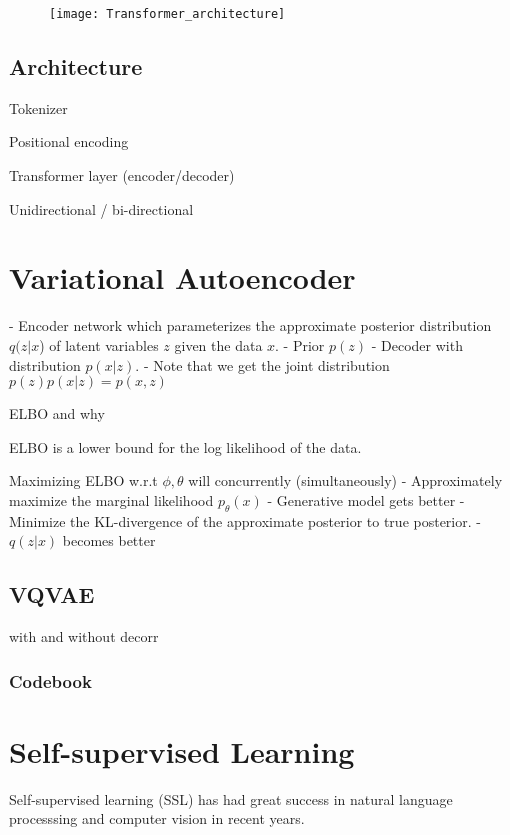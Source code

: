 \documentclass[../../thesis.tex]{subfiles}
\begin{document}
\begin{figure}[h]
    \texttt{[image: Transformer\_architecture]}
    \centering    
\end{figure}

\subsection{Architecture}

Tokenizer

Positional encoding


Transformer layer (encoder/decoder)


Unidirectional / bi-directional




\section{Variational Autoencoder}


- Encoder network which parameterizes the approximate posterior distribution $q(z|x$) of latent variables $z$ given the data $x$.
- Prior $p(z)$
- Decoder with distribution $p(x|z)$. 
- Note that we get the joint distribution $p(z)p(x|z) = p(x,z)$

ELBO and why

ELBO is a lower bound for the log likelihood of the data.

Maximizing ELBO w.r.t $\phi, \theta$  will concurrently (simultaneously)
- Approximately maximize the marginal likelihood $p_\theta(x)$ 
	- Generative model gets better
- Minimize the KL-divergence of the approximate posterior to true posterior. 
	- $q(z|x)$ becomes better

\subsection{VQVAE}

with and without decorr

\subsubsection{Codebook}


\section{Self-supervised Learning}
Self-supervised learning (SSL) has had great success in natural language processsing and computer vision in recent years. 
\end{document}
